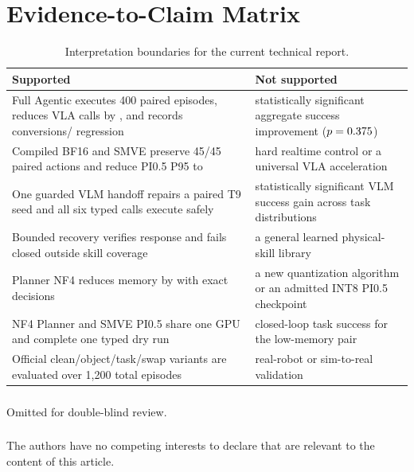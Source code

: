 \documentclass[runningheads]{waica}
\begin{document}
\section{Evidence-to-Claim Matrix}

\begin{table}
\caption{Interpretation boundaries for the current technical report.}
\label{tab:claims}
\centering
\small
\begin{tabularx}{\textwidth}{p{}X}
\toprule
Supported & Not supported \\
\midrule
Full Agentic executes 400 paired episodes, reduces VLA calls by \CarveFullCallReduction{}, and records \CarveFullConversions{} conversions/\CarveFullRegressions{} regression & statistically significant aggregate success improvement ($p=0.375$) \\
Compiled BF16 and SMVE preserve 45/45 paired actions and reduce PI0.5 P95 to \CarveFinalSmvePninetyfive{} & hard realtime control or a universal VLA acceleration \\
One guarded VLM handoff repairs a paired T9 seed and all six typed calls execute safely & statistically significant VLM success gain across task distributions \\
Bounded recovery verifies response and fails closed outside skill coverage & a general learned physical-skill library \\
Planner NF4 reduces memory by \CarvePlannerNfMemoryReduction{} with exact decisions & a new quantization algorithm or an admitted INT8 PI0.5 checkpoint \\
NF4 Planner and SMVE PI0.5 share one GPU and complete one typed dry run & closed-loop task success for the low-memory pair \\
Official clean/object/task/swap variants are evaluated over 1,200 total episodes & real-robot or sim-to-real validation \\
\bottomrule
\end{tabularx}
\end{table}

\begin{credits}
\subsubsection{\ackname}
Omitted for double-blind review.

\subsubsection{\discintname}
The authors have no competing interests to declare that are relevant to the content of this article.
\end{credits}



\end{document}
